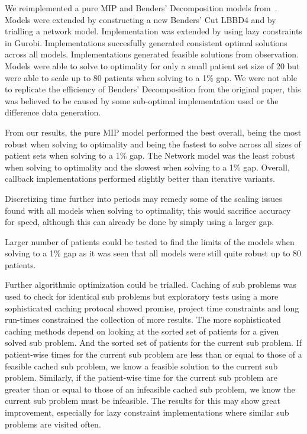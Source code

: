 We reimplemented a pure MIP and Benders' Decomposition models from~\cite{roshanaei2017propagating}. Models were extended by constructing a new Benders' Cut LBBD4 and by trialling a network model. Implementation was extended by using lazy constraints in Gurobi. Implementations succesfully generated consistent optimal solutions across all models. Implementations generated feasible solutions from observation. Models were able to solve to optimality for only a small patient set size of 20 but were able to scale up to 80 patients when solving to a 1\% gap. We were not able to replicate the efficiency of Benders' Decomposition from the original paper, this was believed to be caused by some sub-optimal implementation used or the difference data generation.  

From our results, the pure MIP model performed the best overall, being the most robust when solving to optimality and being the fastest to solve across all sizes of patient sets when solving to a 1\% gap. The Network model was the least robust when solving to optimality and the slowest when solving to a 1\% gap. Overall, callback implementations performed slightly better than iterative variants.

Discretizing time further into periods may remedy some of the scaling issues found with all models when solving to optimality, this would sacrifice accuracy for speed, although this can already be done by simply using a larger gap. 

Larger number of patients could be tested to find the limits of the models when solving to a 1\% gap as it was seen that all models were still quite robust up to 80 patients. 

Further algorithmic optimization could be trialled. Caching of sub problems was used to check for identical sub problems but exploratory tests using a more sophisticated caching protocal showed promise, project time constraints and long run-times constrained the collection of more results. The more sophisticated caching methods depend on looking at the sorted set of patients for a given solved sub problem. And the sorted set of patients for the current sub problem. If patient-wise times for the current sub problem are less than or equal to those of a feasible cached sub problem, we know a feasible solution to the current sub problem. Similarly, if the patient-wise time for the current sub problem are greater than or equal to those of an infeasible cached sub problem, we know the current sub problem must be infeasible. The results for this may show great improvement, especially for lazy constraint implementations where similar sub problems are visited often.

